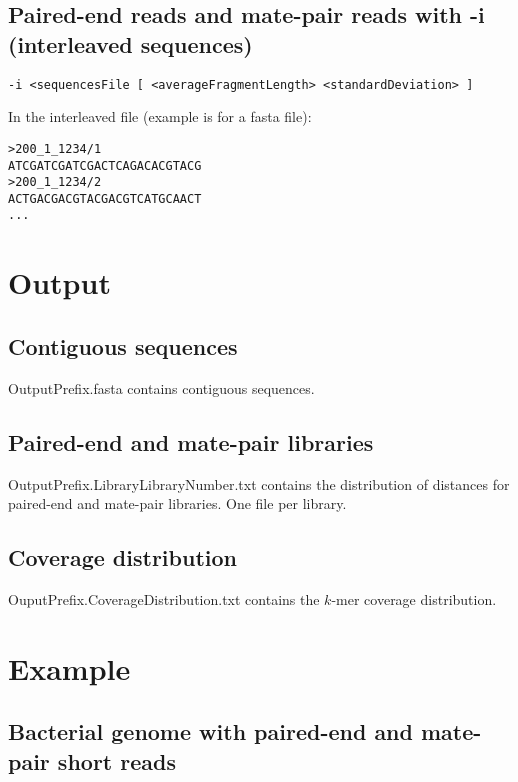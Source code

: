 \documentclass{article}
\begin{document}
\subsection{Paired-end reads and mate-pair reads with -i (interleaved sequences)}

\begin{verbatim}
-i <sequencesFile [ <averageFragmentLength> <standardDeviation> ]
\end{verbatim}

In the interleaved file (example is for a fasta file):

\begin{verbatim}
>200_1_1234/1
ATCGATCGATCGACTCAGACACGTACG
>200_1_1234/2
ACTGACGACGTACGACGTCATGCAACT
...
\end{verbatim}



\section{Output}

\subsection{Contiguous sequences}

OutputPrefix.fasta contains contiguous sequences.

\subsection{Paired-end and mate-pair libraries}

OutputPrefix.LibraryLibraryNumber.txt contains the distribution of distances for paired-end and mate-pair libraries. One file per library.

\subsection{Coverage distribution}

OuputPrefix.CoverageDistribution.txt contains the $k$-mer coverage distribution.

\section{Example}

\subsection{Bacterial genome with paired-end and mate-pair short reads}
\end{document}
